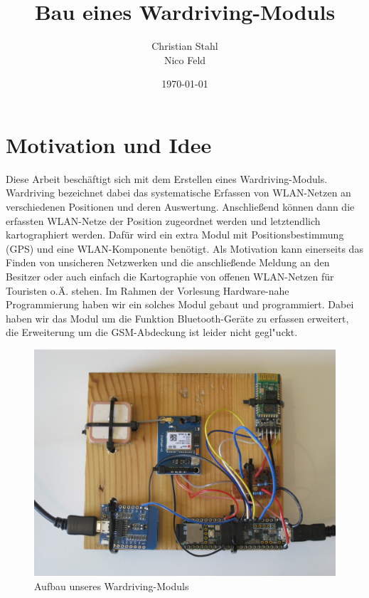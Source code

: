 \documentclass[a4paper,11pt, ngerman]{scrartcl}
\author{Christian Stahl\\Nico Feld}
\title{Bau eines Wardriving-Moduls}
\date{\today}
\begin{document}
\maketitle
\pagebreak
{}
\pagebreak
\section{Motivation und Idee}
Diese Arbeit beschäftigt sich mit dem Erstellen eines Wardriving-Moduls. \grqq Wardriving\grqq{} bezeichnet dabei das systematische Erfassen von WLAN-Netzen an verschiedenen Positionen und deren Auswertung. Anschließend können dann die erfassten WLAN-Netze der Position zugeordnet werden und letztendlich kartographiert werden. Dafür wird ein extra Modul mit Positionsbestimmung (GPS) und eine WLAN-Komponente benötigt. Als Motivation kann einerseits das Finden von unsicheren Netzwerken und die anschließende Meldung an den Besitzer oder auch einfach die Kartographie von offenen WLAN-Netzen für Touristen o.Ä. stehen. Im Rahmen der Vorlesung \grqq Hardware-nahe Programmierung\grqq{} haben wir ein solches Modul gebaut und programmiert. Dabei haben wir das Modul um die Funktion Bluetooth-Geräte zu erfassen erweitert, die Erweiterung um die GSM-Abdeckung ist leider nicht gegl"uckt.

\begin{figure}[H]
	\includegraphics[width=.95\linewidth]{Aufbau.JPG}\caption{Aufbau unseres Wardriving-Moduls}\label{abb:compl}
\end{figure}
\end{document}
